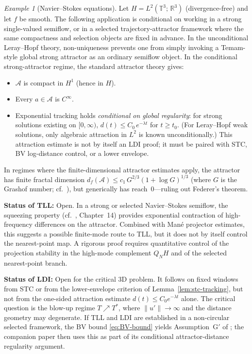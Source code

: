 \documentclass[12pt,a4paper]{article}
\theoremstyle{definition}
\theoremstyle{plain}
\theoremstyle{remark}
\newtheorem{example}[definition]{Example}
\begin{document}
\begin{example}[Navier--Stokes equations]
\label{ex:NS}
Let $H = L^2(\mathbb{T}^3;\,\mathbb{R}^3)$ (divergence-free)
and let $f$ be smooth.  The following application is conditional
on working in a strong single-valued semiflow, or in a selected
trajectory-attractor framework where the same compactness and
selection objects are fixed in advance.  In the unconditional
Leray--Hopf theory, non-uniqueness prevents one from simply invoking
a Temam-style global strong attractor as an ordinary semiflow
object.  In the conditional strong-attractor regime, the standard
attractor theory gives:
\begin{itemize}
  \item $\mathcal{A}$ is compact in $H^1$ (hence in $H$).
  \item Every $a \in \mathcal{A}$ is $C^\infty$.
  \item Exponential tracking holds \emph{conditional on global
    regularity}: for strong solutions existing on $[0,\infty)$,
    $d(t) \le C_0\,e^{-\lambda t}$ for $t \ge t_0$.
    (For Leray--Hopf weak solutions, only algebraic attraction
    in $L^2$ is known unconditionally.)  This attraction estimate
    is not by itself an LDI proof; it must be paired with STC,
    BV log-distance control, or a lower envelope.
\end{itemize}

In regimes where the finite-dimensional attractor estimates apply,
the attractor has finite fractal dimension
$d_f(\mathcal{A}) \le c_1\,G^{2/3}(1+\log G)^{1/3}$
(where $G$ is the Grashof number;
cf.~\cite{ConstantinFoiasTemam1985}), but generically has
reach~$0$---ruling out Federer's theorem.

\medskip\noindent
\textbf{Status of TLL:}\; Open.  In a strong or selected
Navier--Stokes semiflow, the squeezing property
(cf.~\cite{FoiasManleyRosaTemam2001},
Chapter~14) provides exponential contraction of high-frequency
differences on the attractor.  Combined with Mané projector
estimates, this suggests a possible finite-mode route to TLL, but
it does not by itself control the nearest-point map.  A rigorous
proof requires quantitative control of the projection stability in
the high-mode complement $Q_N H$ and of the selected nearest-point
branch.

\medskip\noindent
\textbf{Status of LDI:}\; Open for the critical 3D problem.
It follows on fixed windows from STC or from the lower-envelope
criterion of Lemma~\ref{lem:stc-tracking}, but not from the
one-sided attraction estimate $d(t)\le C_0e^{-\lambda t}$ alone.
The critical question is the blow-up regime $T \nearrow T^*$,
where $\|u'\| \to \infty$ and the distance geometry may degenerate.
If TLL and LDI are established in a non-circular selected framework,
the BV bound \eqref{eq:BV-bound} yields Assumption~G$'$ of
\cite{FST-NS2026}; the companion paper then uses this as part of
its conditional attractor-distance regularity argument.


\end{example}
\end{document}
